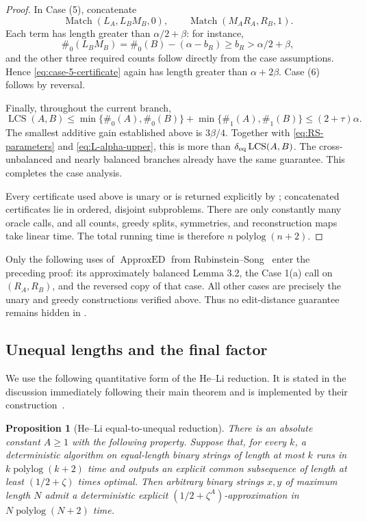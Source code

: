 \documentclass[11pt]{article}
\newtheorem{proposition}[proposition]{Proposition}
\theoremstyle{remark}
\newcommand{\LCS}{\operatorname{LCS}}
\newcommand{\polylog}{\operatorname{polylog}}
\newcommand{\Match}{\operatorname{Match}}
\begin{document}
\begin{proof}
In Case (5), concatenate
\begin{equation}\label{eq:case-5-certificate}
 \Match(L_A,L_BM_B,0),\qquad
 \Match(M_AR_A,R_B,1).
\end{equation}
Each term has length greater than $\alpha/2+\beta$: for instance,
\[
 \#_0(L_BM_B)=\#_0(B)-(\alpha-b_R)
 \ge b_R>\alpha/2+\beta,
\]
and the other three required counts follow directly from the case
assumptions.  Hence \eqref{eq:case-5-certificate} again has length
greater than $\alpha+2\beta$.  Case (6) follows by reversal.

Finally, throughout the current branch,
\begin{equation}\label{eq:L-alpha-upper}
 \LCS(A,B)\le
 \min\{\#_0(A),\#_0(B)\}+\min\{\#_1(A),\#_1(B)\}
 \le(2+\tau)\alpha.
\end{equation}
The smallest additive gain established above is $3\beta/4$.
Together with \eqref{eq:RS-parameters} and
\eqref{eq:L-alpha-upper}, this is more than
$\delta_{\rm eq}\LCS(A,B)$.  The cross-unbalanced and nearly balanced
branches already have the same guarantee.  This completes the case
analysis.

Every certificate used above is unary or is returned explicitly by
; concatenated certificates lie in ordered,
disjoint subproblems.  There are only constantly many oracle calls,
and all counts, greedy splits, symmetries, and reconstruction maps take
linear time.  The total running time is therefore
$n\polylog(n+2)$.
\end{proof}

Only the following uses of $\operatorname{ApproxED}$ from
Rubinstein--Song~\cite{RubinsteinSong} enter the preceding proof: its
approximately balanced Lemma 3.2, the Case 1(a) call on $(R_A,R_B)$,
and the reversed copy of that case.
All other cases are precisely the unary and greedy constructions
verified above.  Thus no edit-distance guarantee remains hidden in
.

\subsection{Unequal lengths and the final factor}

We use the following quantitative form of the He--Li reduction.  It is
stated in the discussion immediately following their main theorem and
is implemented by their construction~\cite{HeLi}.

\begin{proposition}[He--Li equal-to-unequal reduction]
\label{prop:HeLi}
There is an absolute constant $A\ge1$ with the following property.
Suppose that, for every $k$, a deterministic algorithm on
equal-length binary strings of length at most $k$ runs in
$k\polylog(k+2)$ time and outputs an explicit common subsequence of
length at least $(1/2+\zeta)$ times optimal.  Then arbitrary binary
strings $x,y$ of maximum length $N$ admit a deterministic explicit
$(1/2+\zeta^A)$-approximation in $N\polylog(N+2)$ time.
\end{proposition}
\end{document}
